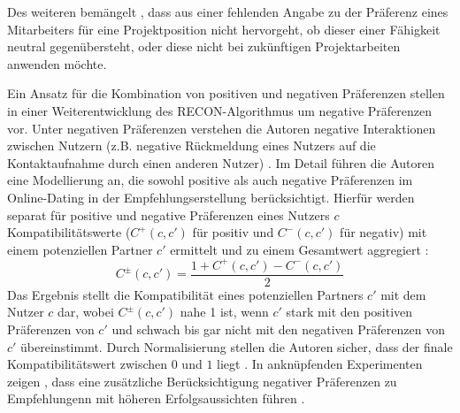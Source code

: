 Des weiteren bemängelt \textcite[S. 69]{link:booklet}, dass aus einer fehlenden Angabe zu der Präferenz eines Mitarbeiters für eine Projektposition nicht hervorgeht, ob dieser einer Fähigkeit neutral gegenübersteht, oder diese nicht bei zukünftigen Projektarbeiten anwenden möchte.

Ein Ansatz für die Kombination von positiven und negativen Präferenzen stellen \textcite[S. 269ff.]{pizzato:2:inproceedings} in einer Weiterentwicklung des RECON-Algorithmus um negative Präferenzen vor.
Unter negativen Präferenzen verstehen die Autoren negative Interaktionen zwischen Nutzern (z.B. negative Rückmeldung eines Nutzers auf die Kontaktaufnahme durch einen anderen Nutzer) \cite[S. 273]{pizzato:2:inproceedings}.
Im Detail führen die Autoren eine Modellierung an, die sowohl positive als auch negative Präferenzen im Online-Dating in der Empfehlungserstellung berücksichtigt.
Hierfür werden separat für positive und negative Präferenzen eines Nutzers $c$ Kompatibilitätswerte ($C^{+}(c,c')$ für positiv und $C^{-}(c,c')$ für negativ) mit einem potenziellen Partner $c'$ ermittelt und zu einem Gesamtwert aggregiert \cite[S. 273]{pizzato:2:inproceedings}:
\begin{equation}\label{eq39}
    C^{\pm}(c,c')=\frac{1+C^{+}(c,c')-C^{-}(c,c')}{2}
\end{equation}
Das Ergebnis stellt die Kompatibilität eines potenziellen Partners $c'$ mit dem Nutzer $c$ dar, wobei $C^{\pm}(c,c')$ nahe 1 ist, wenn $c'$ stark mit den positiven Präferenzen von $c'$ und schwach bis gar nicht mit den negativen Präferenzen von $c'$ übereinstimmt.
Durch Normalisierung stellen die Autoren sicher, dass der finale Kompatibilitätswert zwischen $0$ und $1$ liegt \cite[S. 273]{pizzato:2:inproceedings}.
In anknüpfenden Experimenten zeigen \textcite[S. 279]{pizzato:2:inproceedings}, dass eine zusätzliche Berücksichtigung negativer Präferenzen zu Empfehlungenn mit höheren Erfolgsaussichten führen \cite[S. 279]{pizzato:2:inproceedings}.


